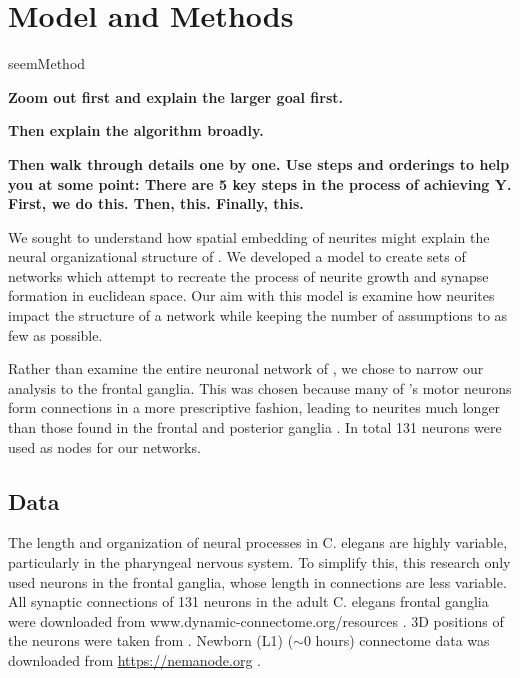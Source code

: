 \section{Model and Methods}

{seemMethod}

\textbf{Zoom out first and explain the larger goal first.}

\textbf{Then explain the algorithm broadly.}

\textbf{Then walk through details one by one. Use steps and orderings to help you at some point: There are 5 key steps in the process of achieving Y. First, we do this. Then, this. Finally, this.}

We sought to understand how spatial embedding of neurites might explain the neural organizational structure of \ce. 
We developed a model to create sets of networks which attempt to recreate the process of neurite growth and synapse formation in euclidean space. 
Our aim with this model is examine how neurites impact the structure of a network while keeping the number of assumptions to as few as possible.

Rather than examine the entire neuronal network of \ce, we chose to narrow our analysis to the frontal ganglia. 
This was chosen because many of \ce's motor neurons form connections in a more prescriptive fashion, leading to neurites much longer than those found in the frontal and posterior ganglia \citep{Witvliet}. 
In total 131 neurons were used as nodes for our networks.

\subsection{Data}
The length and organization of neural processes in C. elegans are highly variable, particularly in the pharyngeal nervous system. 
To simplify this, this research only used neurons in the frontal ganglia, whose length in connections are less variable. 
All synaptic connections of 131 neurons in the adult C. elegans frontal ganglia were downloaded from www.dynamic-connectome.org/resources \citep{Kaiser,Kotter,McCormick}. 
3D positions of the neurons were taken from \cite{Skuhersky}. 
Newborn (L1) ($\sim 0$ hours) connectome data was downloaded from \url{https://nemanode.org} \citep{Witvliet}.

